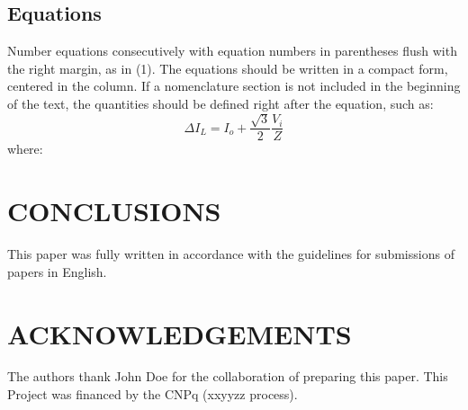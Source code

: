 \documentclass[english]{sobraep}
\begin{document}
\subsection{Equations}
Number equations consecutively with equation numbers in parentheses flush with the right margin, as in (1). The equations should be written in a compact form, centered in the column. If a nomenclature section is not included in the beginning of the text, the quantities should be defined right after the equation, such as:
\begin{equation}
	\Delta I_{L}=I_{o}+\frac{\sqrt{3}}{2}\frac{V_{i}}{Z}
\end{equation}
where:





\section{CONCLUSIONS}
This paper was fully written in accordance with the guidelines for submissions of papers in English.


\section*{ACKNOWLEDGEMENTS}
The authors thank John Doe for the collaboration of preparing this paper. This Project was financed by the CNPq (xxyyzz process).





\balance
\end{document}
